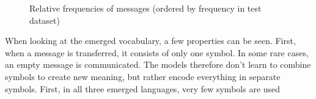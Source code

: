 \begin{figure}[h]
    \centering
    \caption{Relative frequencies of messages (ordered by frequency in test dataset)}
    \label{fig:relative_frequencies_vocabularies}
\end{figure}

When looking at the emerged vocabulary, a few properties can be seen.
First, when a message is transferred, it consists of only one symbol.
In some rare cases, an empty message is communicated.
The models therefore don't learn to combine symbols to create new meaning, but rather encode everything in separate symbols.
First, in all three emerged languages, very few symbols are used

